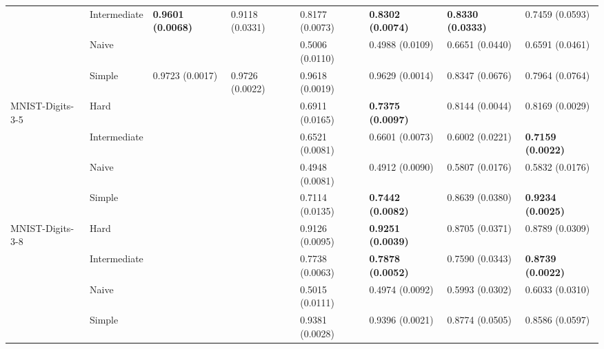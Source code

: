 \begin{tabular}{llllllll}
                 & Intermediate &  \textbf{0.9601 (0.0068)} &           0.9118 (0.0331) &           0.8177 (0.0073) &  \textbf{0.8302 (0.0074)} &  \textbf{0.8330 (0.0333)} &           0.7459 (0.0593) \\
                 & Naive &                           &                           &           0.5006 (0.0110) &           0.4988 (0.0109) &           0.6651 (0.0440) &           0.6591 (0.0461) \\
                 & Simple &           0.9723 (0.0017) &           0.9726 (0.0022) &           0.9618 (0.0019) &           0.9629 (0.0014) &           0.8347 (0.0676) &           0.7964 (0.0764) \\
MNIST-Digits-3-5 & Hard &                           &                           &           0.6911 (0.0165) &  \textbf{0.7375 (0.0097)} &           0.8144 (0.0044) &           0.8169 (0.0029) \\
                 & Intermediate &                           &                           &           0.6521 (0.0081) &           0.6601 (0.0073) &           0.6002 (0.0221) &  \textbf{0.7159 (0.0022)} \\
                 & Naive &                           &                           &           0.4948 (0.0081) &           0.4912 (0.0090) &           0.5807 (0.0176) &           0.5832 (0.0176) \\
                 & Simple &                           &                           &           0.7114 (0.0135) &  \textbf{0.7442 (0.0082)} &           0.8639 (0.0380) &  \textbf{0.9234 (0.0025)} \\
MNIST-Digits-3-8 & Hard &                           &                           &           0.9126 (0.0095) &  \textbf{0.9251 (0.0039)} &           0.8705 (0.0371) &           0.8789 (0.0309) \\
                 & Intermediate &                           &                           &           0.7738 (0.0063) &  \textbf{0.7878 (0.0052)} &           0.7590 (0.0343) &  \textbf{0.8739 (0.0022)} \\
                 & Naive &                           &                           &           0.5015 (0.0111) &           0.4974 (0.0092) &           0.5993 (0.0302) &           0.6033 (0.0310) \\
                 & Simple &                           &                           &           0.9381 (0.0028) &           0.9396 (0.0021) &           0.8774 (0.0505) &           0.8586 (0.0597) \\

\end{tabular}
